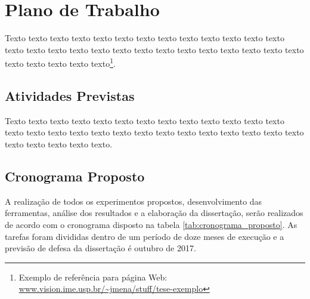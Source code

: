 \chapter{Plano de Trabalho}
\label{cap:conclusoes}

Texto texto texto texto texto texto texto texto texto texto texto texto texto
texto texto texto texto texto texto texto texto texto texto texto texto texto
texto texto texto texto texto texto\footnote{Exemplo de referência para página
Web: \url{www.vision.ime.usp.br/~jmena/stuff/tese-exemplo}}.

\section{Atividades Previstas} 

Texto texto texto texto texto texto texto texto texto texto texto texto texto
texto texto texto texto texto texto texto texto texto texto texto texto texto
texto texto texto texto texto texto. 


\section{Cronograma Proposto}
A realização de todos os experimentos propostos, desenvolvimento das ferramentas, análise dos resultados e a elaboração da dissertação, serão realizados de acordo com o cronograma disposto na tabela \ref{tab:cronograma_proposto}. As tarefas foram divididas dentro de um período de doze meses de execução e a previsão de defesa da dissertação é outubro de 2017.

